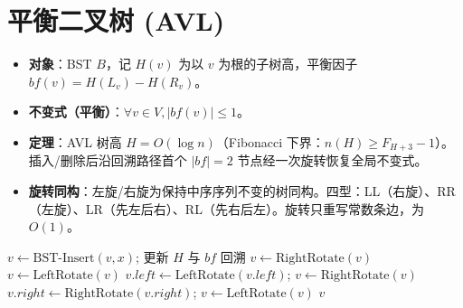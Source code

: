 \section{平衡二叉树 (AVL)}

\begin{itemize}
    \item \textbf{对象}：BST $B$，记 $H(v)$ 为以 $v$ 为根的子树高，平衡因子 $bf(v) = H(L_v) - H(R_v)$。
    \item \textbf{不变式（平衡）}：$\forall v \in V, |bf(v)| \le 1$。
    \item \textbf{定理}：AVL 树高 $H = O(\log n)$（Fibonacci 下界：$n(H) \ge F_{H+3} - 1$）。插入/删除后沿回溯路径首个 $|bf| = 2$ 节点经一次旋转恢复全局不变式。
    \item \textbf{旋转同构}：左旋/右旋为保持中序序列不变的树同构。四型：LL（右旋）、RR（左旋）、LR（先左后右）、RL（先右后左）。旋转只重写常数条边，为 $O(1)$。
\end{itemize}

\begin{algorithm}[H]
\caption{AVL 插入与重平衡规约}
\begin{algorithmic}[1]
    \State $v\gets\text{BST-Insert}(v,x)$; 更新 $H$ 与 $bf$ 回溯
     
         $v\gets\text{RightRotate}(v)$ 
         $v\gets\text{LeftRotate}(v)$ 
         $v.left\gets\text{LeftRotate}(v.left)$; $v\gets\text{RightRotate}(v)$ 
        \Else $v.right\gets\text{RightRotate}(v.right)$; $v\gets\text{LeftRotate}(v)$ 
        \EndIf
    \EndIf
    \State \Return $v$
\EndProcedure
\end{algorithmic}
\end{algorithm}

